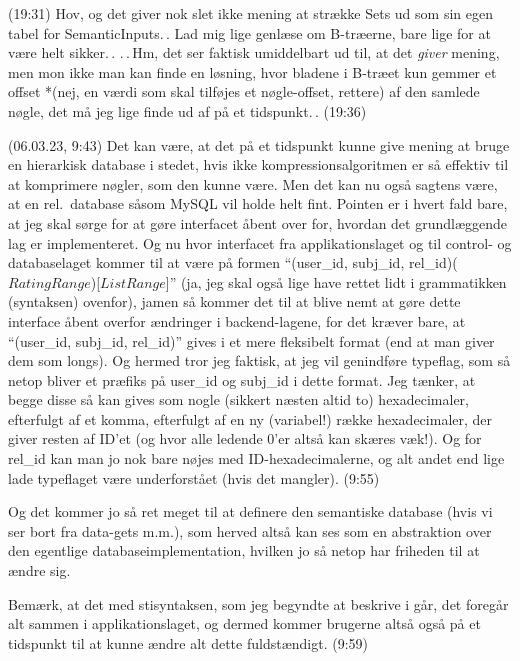 \documentclass{report}
\begin{document}
(19:31) Hov, og det giver nok slet ikke mening at strække Sets ud som sin egen tabel for SemanticInputs.\,. Lad mig lige genlæse om B-træerne, bare lige for at være helt sikker.\,. .\,.\,Hm, det ser faktisk umiddelbart ud til, at det \emph{giver} mening, men mon ikke man kan finde en løsning, hvor bladene i B-træet kun gemmer et offset *(nej, en værdi som skal tilføjes et nøgle-offset, rettere) af den samlede nøgle, det må jeg lige finde ud af på et tidspunkt.\,. (19:36)


(06.03.23, 9:43) Det kan være, at det på et tidspunkt kunne give mening at bruge en hierarkisk database i stedet, hvis ikke kompressionsalgoritmen er så effektiv til at komprimere nøgler, som den kunne være. Men det kan nu også sagtens være, at en rel.\ database såsom MySQL vil holde helt fint. Pointen er i hvert fald bare, at jeg skal sørge for at gøre interfacet åbent over for, hvordan det grundlæggende lag er implementeret. Og nu hvor interfacet fra applikationslaget og til control- og databaselaget kommer til at være på formen ``(user\_id, subj\_id, rel\_id)($RatingRange$)[$ListRange$]'' (ja, jeg skal også lige have rettet lidt i grammatikken (syntaksen) ovenfor), jamen så kommer det til at blive nemt at gøre dette interface åbent overfor ændringer i backend-lagene, for det kræver bare, at ``(user\_id, subj\_id, rel\_id)'' gives i et mere fleksibelt format (end at man giver dem som longs). Og hermed tror jeg faktisk, at jeg vil genindføre typeflag, som så netop bliver et præfiks på user\_id og subj\_id i dette format. Jeg tænker, at begge disse så kan gives som nogle (sikkert næsten altid to) hexadecimaler, efterfulgt af et komma, efterfulgt af en ny (variabel!) række hexadecimaler, der giver resten af ID'et (og hvor alle ledende 0'er altså kan skæres væk!). Og for rel\_id kan man jo nok bare nøjes med ID-hexadecimalerne, og alt andet end lige lade typeflaget være underforstået (hvis det mangler). (9:55)

Og det kommer jo så ret meget til at definere den semantiske database (hvis vi ser bort fra data-gets m.m.), som herved altså kan ses som en abstraktion over den egentlige databaseimplementation, hvilken jo så netop har friheden til at ændre sig. 

Bemærk, at det med stisyntaksen, som jeg begyndte at beskrive i går, det foregår alt sammen i applikationslaget, og dermed kommer brugerne altså også på et tidspunkt til at kunne ændre alt dette fuldstændigt. (9:59)
\end{document}
